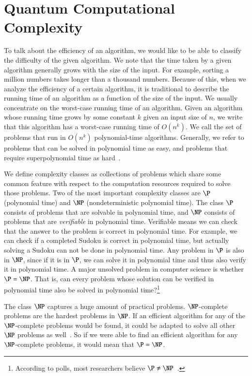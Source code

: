 \documentclass[twocolumn, switch]{article}
\begin{document}
    \section{Quantum Computational Complexity} \label{sec:quantum-comptational-complexity}
    To talk about the efficiency of an algorithm, we would like to be able to classify the difficulty of the given algorithm.
    We note that the time taken by a given algorithm generally grows with the size of the input.
    For example, sorting a million numbers takes longer than a thousand numbers.
    Because of this, when we analyze the efficiency of a certain algorithm, it is traditional to describe the running time of an algorithm as a function of the size of the input.
    We usually concentrate on the worst-case running time of an algorithm.
    Given an algorithm whose running time grows by some constant $k$ given an input size of $n$, we write that this algorithm has a worst-case running time of $O(n^k)$.
    We call the set of problems that run in $O(n^k)$ polynomial-time algorithms.
    Generally, we refer to problems that can be solved in polynomial time as easy, and problems that require superpolynomial time as hard~\cite{cormen2009introduction}.
    
    We define complexity classes as collections of problems which share some common feature with respect to the computation resources required to solve those problems.
    Two of the most important complexity classes are $\P$ (polynomial time) and $\NP$ (nondeterministic polynomial time).
    The class $\P$ consists of problems that are solvable in polynomial time, and $\NP$ consists of problems that are \emph{verifiable} in polynomial time.
    Verifiable means we can check that the answer to the problem is correct in polynomial time.
    For example, we can check if a completed Sudoku is correct in polynomial time, but actually solving a Sudoku can not be done in polynomial time.
    Any problem in $\P$ is also in $\NP$, since if it is in $\P$, we can solve it in polynomial time and thus also verify it in polynomial time.
    A major unsolved problem in computer science is whether $\P = \NP$.
    That is, can every problem whose solution can be verified in polynomial time also be solved in polynomial time?\footnote{According to polls, most researchers believe $\P \neq \NP$~\cite{hemaspaandra2002sigact, hemaspaandra2012sigact, hemaspaandra2019sigact}.}
    
    The class $\NP$ captures a huge amount of practical problems.
    $\NP$-complete problems are the hardest problems in $\NP$.
    If an efficient algorithm for any of the $\NP$-complete problems would be found, it could be adapted to solve all other $\NP$ problems as well~\cite{aaronson2008limits}.
    So if we were able to find an efficient algorithm for any $\NP$-complete problems, it would mean that $\P = \NP$.
    
\end{document}
